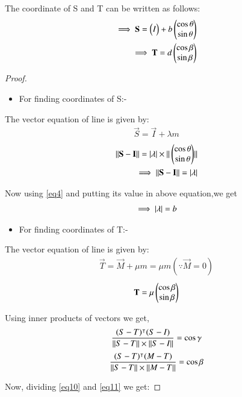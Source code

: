 \documentclass[journal,12pt,twocolumn]{IEEEtran}
\begin{document}
\begin{enumerate}
\begin{lemma}
\label{lemma}
The coordinate of S and T can be written as follows:
\begin{align}
\implies \mathbf{S}=\begin{pmatrix}I\end{pmatrix} + b\begin{pmatrix}\cos\theta \\\sin \theta \end{pmatrix} \label{eq13}
\\
\implies \mathbf{T}= d\begin{pmatrix}\cos \beta\\\sin \beta \end{pmatrix}
\end{align}
\end{lemma}
\begin{proof}
\begin{itemize}
\item For finding coordinates of S:-
\end{itemize}
The vector equation of line is given by:
\begin{align}
\vec{S}=\vec{I} + \lambda m \label{eq8}
\end{align}
\begin{align}
\Vert\mathbf{S}-\mathbf{I}\rVert = \vert\lambda\vert\times\Vert\begin{pmatrix}\cos \theta\\\sin \theta\end{pmatrix}\rVert 
\\
\implies \Vert\mathbf{S}-\mathbf{I}\rVert=\vert\lambda\vert
\end{align}
\item Now using \eqref{eq4} and putting its value in above equation,we get
\begin{align}
\implies \vert\lambda\vert=b \label{eq12}
\end{align}
\begin{itemize}
\item For finding coordinates of T:-
\end{itemize}
The vector equation of line is given by:
\begin{align}
\vec{T}=\vec{M} + \mu m =\mu m (\because \vec{M}=0) 
\end{align}
\begin{align}
\mathbf{T}=\mu \begin{pmatrix}\cos \beta\\\sin \beta \end{pmatrix} \label{eq9}
\end{align}
\item Using inner products of vectors we get,
\begin{align}
\frac{(S-T)^\intercal(S-I)}{\Vert S-T\rVert\times\Vert S-I\rVert}=\cos\gamma \label{eq10}
\end{align}
\begin{align}
\frac{(S-T)^\intercal(M-T)}{\Vert S-T\rVert\times\Vert M-T\rVert}=\cos \beta \label{eq11}
\end{align}
\item Now, dividing \eqref{eq10} and \eqref{eq11} we get:

\end{proof}
\end{enumerate}
\end{document}
